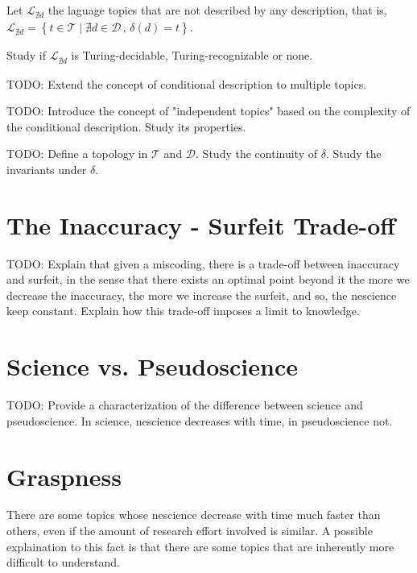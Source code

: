 Let $\mathcal{L}_{\nexists d}$ the laguage topics that are not described by any description, that is, $\mathcal{L}_{\nexists d}=\left\{ t\in\mathcal{T}\mid\nexists d\in\mathcal{D}\,,\,\delta\left(d\right)=t\right\}$.

\begin{proposition}
Study if $\mathcal{L}_{\nexists d}$ is Turing-decidable, Turing-recognizable or none.
\end{proposition}

{\color{red} TODO: Extend the concept of conditional description to multiple topics.}

{\color{red} TODO: Introduce the concept of "independent topics" based on the complexity of the conditional description. Study its properties.}

{\color{red} TODO: Define a topology in $\mathcal{T}$ and $\mathcal{D}$. Study the continuity of $\delta$. Study the invariants under $\delta$.}


%
%

\section{The Inaccuracy - Surfeit Trade-off}

{\color{red} TODO: Explain that given a miscoding, there is a trade-off between inaccuracy and surfeit, in the sense that there exists an optimal point beyond it the more we decrease the inaccuracy, the more we increase the surfeit, and so, the nescience keep constant. Explain how this trade-off imposes a limit to knowledge.}

%
%

\section{Science vs. Pseudoscience}

{\color{red} TODO: Provide a characterization of the difference between science and pseudoscience. In science, nescience decreases with time, in pseudoscience not.}

%
%
\section{Graspness}

There are some topics whose nescience decrease with time much faster than others, even if the amount of research effort involved is similar. A possible explaination to this fact is that there are some topics that are inherently more difficult to understand.

